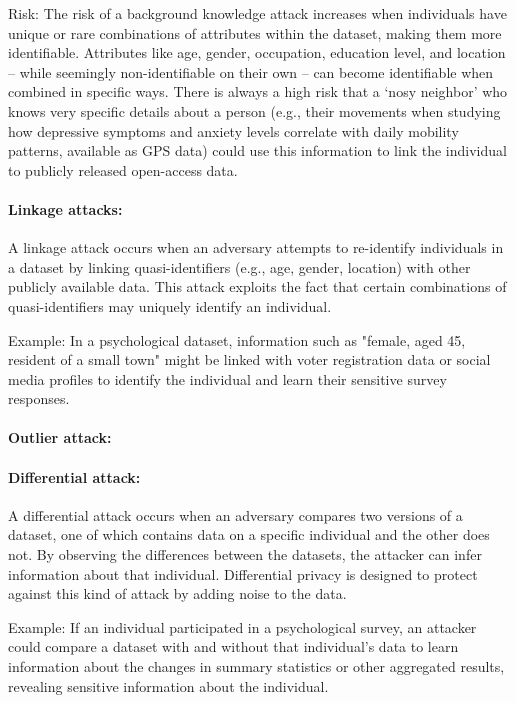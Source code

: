 \documentclass{article}
\begin{document}
Risk: The risk of a background knowledge attack increases when individuals have unique or rare combinations of attributes within the dataset, making them more identifiable. Attributes like age, gender, occupation, education level, and location -- while seemingly non-identifiable on their own -- can become identifiable when combined in specific ways. There is always a high risk that a ‘nosy neighbor’ who knows very specific details about a person (e.g., their movements when studying how depressive symptoms and anxiety levels correlate with daily mobility patterns, available as GPS data) could use this information to link the individual to publicly released open-access data.

\color{black}  %

\paragraph{Linkage attacks:}
A linkage attack \cite{2012_Hundepool} occurs when an adversary attempts to re-identify individuals in a dataset by linking quasi-identifiers (e.g., age, gender, location) with other publicly available data. This attack exploits the fact that certain combinations of quasi-identifiers may uniquely identify an individual.

Example: In a psychological dataset, information such as "female, aged 45, resident of a small town" might be linked with voter registration data or social media profiles to identify the individual and learn their sensitive survey responses.

\paragraph{Outlier attack:}


\paragraph{Differential attack:}
A differential attack \cite{2008_Dwork} occurs when an adversary compares two versions of a dataset, one of which contains data on a specific individual and the other does not. By observing the differences between the datasets, the attacker can infer information about that individual. Differential privacy is designed to protect against this kind of attack by adding noise to the data.

Example: If an individual participated in a psychological survey, an attacker could compare a dataset with and without that individual's data to learn information about the changes in summary statistics or other aggregated results, revealing sensitive information about the individual.
\end{document}
